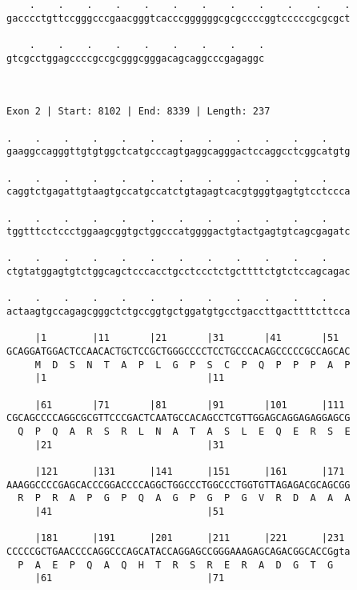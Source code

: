 \documentclass{article}
\begin{document}
\begin{Verbatim}
    .    .    .    .    .    .    .    .    .    .    .    .
gacccctgttccgggcccgaacgggtcacccggggggcgcgccccggtcccccgcgcgct
                                                            
    .    .    .    .    .    .    .    .    .
gtcgcctggagccccgccgcgggcgggacagcaggcccgagaggc
                                             
                                             
 
Exon 2 | Start: 8102 | End: 8339 | Length: 237
 
.    .    .    .    .    .    .    .    .    .    .    .    
gaaggccagggttgtgtggctcatgcccagtgaggcagggactccaggcctcggcatgtg
                                                            
.    .    .    .    .    .    .    .    .    .    .    .    
caggtctgagattgtaagtgccatgccatctgtagagtcacgtgggtgagtgtcctccca
                                                            
.    .    .    .    .    .    .    .    .    .    .    .    
tggtttcctccctggaagcggtgctggcccatggggactgtactgagtgtcagcgagatc
                                                            
.    .    .    .    .    .    .    .    .    .    .    .    
ctgtatggagtgtctggcagctcccacctgcctccctctgcttttctgtctccagcagac
                                                            
.    .    .    .    .    .    .    .    .    .    .    .    
actaagtgccagagcgggctctgccggtgctggatgtgcctgaccttgacttttcttcca
                                                            
     |1        |11       |21       |31       |41       |51  
GCAGGATGGACTCCAACACTGCTCCGCTGGGCCCCTCCTGCCCACAGCCCCCGCCAGCAC
     M  D  S  N  T  A  P  L  G  P  S  C  P  Q  P  P  P  A  P
     |1                            |11                      
  
     |61       |71       |81       |91       |101      |111 
CGCAGCCCCAGGCGCGTTCCCGACTCAATGCCACAGCCTCGTTGGAGCAGGAGAGGAGCG
  Q  P  Q  A  R  S  R  L  N  A  T  A  S  L  E  Q  E  R  S  E
     |21                           |31                      
  
     |121      |131      |141      |151      |161      |171 
AAAGGCCCCGAGCACCCGGACCCCAGGCTGGCCCTGGCCCTGGTGTTAGAGACGCAGCGG
  R  P  R  A  P  G  P  Q  A  G  P  G  P  G  V  R  D  A  A  A
     |41                           |51                      
  
     |181      |191      |201      |211      |221      |231 
CCCCCGCTGAACCCCAGGCCCAGCATACCAGGAGCCGGGAAAGAGCAGACGGCACCGgta
  P  A  E  P  Q  A  Q  H  T  R  S  R  E  R  A  D  G  T  G   
     |61                           |71                      
  

\end{Verbatim}
\end{document}
